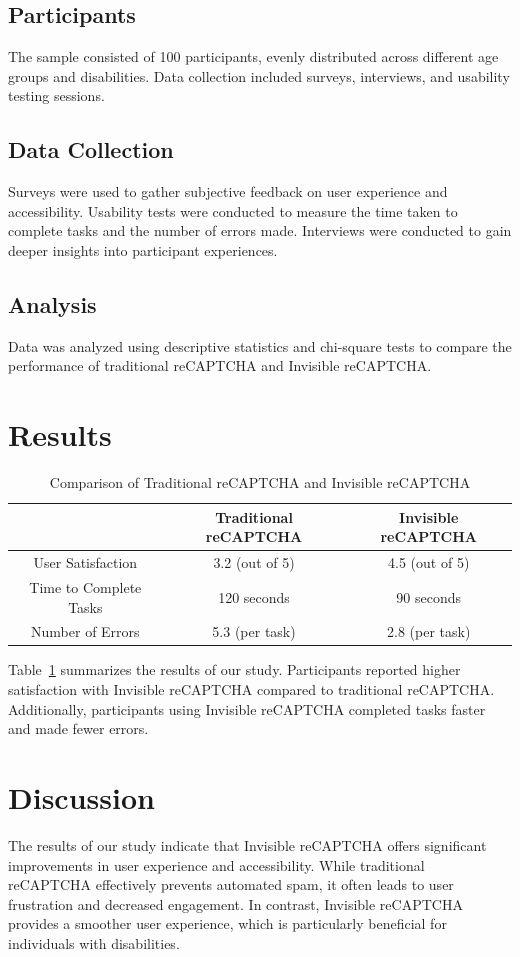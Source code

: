 \documentclass{article}
\begin{document}
\subsection{Participants}
The sample consisted of 100 participants, evenly distributed across different age groups and disabilities. Data collection included surveys, interviews, and usability testing sessions.

\subsection{Data Collection}
Surveys were used to gather subjective feedback on user experience and accessibility. Usability tests were conducted to measure the time taken to complete tasks and the number of errors made. Interviews were conducted to gain deeper insights into participant experiences.

\subsection{Analysis}
Data was analyzed using descriptive statistics and chi-square tests to compare the performance of traditional reCAPTCHA and Invisible reCAPTCHA.

\section{Results}
\begin{table}[ht]
\centering
\begin{tabular}{|c|c|c|}
\hline
& Traditional reCAPTCHA & Invisible reCAPTCHA \\
\hline
User Satisfaction & 3.2 (out of 5) & 4.5 (out of 5) \\
\hline
Time to Complete Tasks & 120 seconds & 90 seconds \\
\hline
Number of Errors & 5.3 (per task) & 2.8 (per task) \\
\hline
\end{tabular}
\caption{Comparison of Traditional reCAPTCHA and Invisible reCAPTCHA}
\label{tab:results}
\end{table}

Table~\ref{tab:results} summarizes the results of our study. Participants reported higher satisfaction with Invisible reCAPTCHA compared to traditional reCAPTCHA. Additionally, participants using Invisible reCAPTCHA completed tasks faster and made fewer errors.

\section{Discussion}
The results of our study indicate that Invisible reCAPTCHA offers significant improvements in user experience and accessibility. While traditional reCAPTCHA effectively prevents automated spam, it often leads to user frustration and decreased engagement. In contrast, Invisible reCAPTCHA provides a smoother user experience, which is particularly beneficial for individuals with disabilities.
\end{document}
